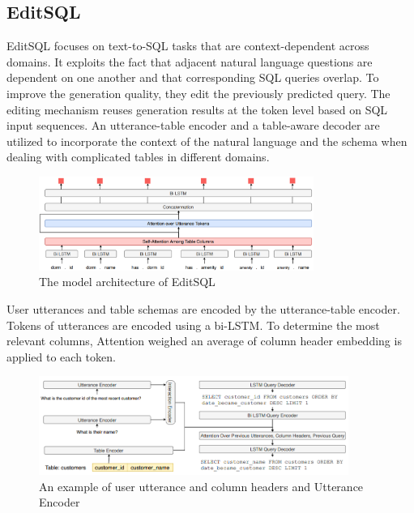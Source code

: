 \subsection{EditSQL}

EditSQL\cite{DBLP:journals/corr/abs-1909-00786} focuses on text-to-SQL tasks that are context-dependent across domains.
It exploits the fact that adjacent natural language questions are dependent on one another and that corresponding SQL queries overlap.
To improve the generation quality, they edit the previously predicted query.
The editing mechanism reuses generation results at the token level based on SQL input sequences.
An utterance-table encoder and a table-aware decoder are utilized to incorporate the context of the natural language and the schema when dealing with complicated tables in different domains.

\begin{figure}[H]
    \centering
    \includegraphics[width=0.8\textwidth]{pics/EditSQL/Table.png}
    \caption{The model architecture of EditSQL \cite{DBLP:journals/corr/abs-1909-00786}}
    \label{fig:EditSQL}
\end{figure}

User utterances and table schemas are encoded by the utterance-table encoder. Tokens of utterances are encoded using a bi-LSTM.
To determine the most relevant columns, Attention weighed an average of column header embedding is applied to each token.

\begin{figure}[H]
    \centering
    \includegraphics[width=0.9\textwidth]{pics/EditSQL/model.png}
    \caption{An example of user utterance and column headers and Utterance Encoder \cite{DBLP:journals/corr/abs-1909-00786}}
    \label{fig:EditSQL_model}
\end{figure}

